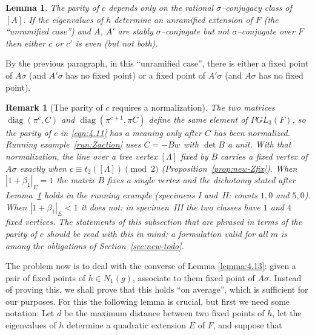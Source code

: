 \documentclass[12pt,letterpaper]{amsart}
\numberwithin{equation}{section}
\newtheorem{lemma}[theorem]{Lemma}
\newtheorem{draftremark}{Remark}
\theoremstyle{definition}
\theoremstyle{plain}
\begin{document}
\begin{lemma}
\label{lemma:4.14}
The parity of $c$ depends only on the rational
$\sigma$--conjugacy class of $[A]$. If the eigenvalues of $h$ determine an
unramified extension of $F$ (the ``unramified case'') and $A$, $A'$ are stably 
$\sigma$--conjugate but not
$\sigma$--conjugate over $F$ then either $c$ or $c'$ is even (but not both). 
\end{lemma}

By the previous paragraph, in this ``unramified case'', there is either 
a fixed point of $A\sigma$ (and $A'\sigma$ has no fixed point) or a
fixed point of $A'\sigma$ (and $A\sigma$ has no fixed point). 
 
\begin{draftremark}[The parity of $c$ requires a normalization]
\label{rem:c-parity}
The two matrices $\operatorname{diag}(\pi^c,C)$ and
$\operatorname{diag}(\pi^{c+1},\pi C)$ define the same element of
$PGL_3(F)$, so the parity of $c$ in \eqref{eqn:4.11} has a meaning
only after $C$ has been normalized. Running example~\ref{run:Zaction}
uses $C=-Bw$ with $\det B$ a unit. With that normalization, the line
over a tree vertex $[\Lambda]$ fixed by $B$ carries a fixed vertex of
$A\sigma$ exactly when $c\equiv t_2([\Lambda])\pmod2$
(Proposition~\ref{prop:new-Zfix}). When $|1+\beta_1|_E=1$ the matrix
$B$ fixes a single vertex and the dichotomy stated after
Lemma~\ref{lemma:4.14} holds in the running example (specimens I
and~II: counts $1,0$ and $5,0$). When $|1+\beta_1|_E<1$ it does not:
in specimen~III the two classes have $1$ and $4$ fixed vertices. The
statements of this subsection that are phrased in terms of the parity
of $c$ should be read with this in mind; a formulation valid for all
$m$ is among the obligations of Section~\ref{sec:new-todo}.
\end{draftremark}

The problem now is to deal with the converse of Lemma \ref{lemma:4.13}: 
given a pair of fixed points
of $h \in N_1(g)$, associate to them fixed point of $A\sigma$. Instead
of proving this, we shall prove that this holds ``on average'', which is
sufficient for our purposes.
For this the following lemma is crucial, but first we need some notation:
Let $d$ be the maximum distance
between two fixed points of $h$, let the eigenvalues of $h$
determine a quadratic extension $E$ of $F$, and suppose that
\end{document}
